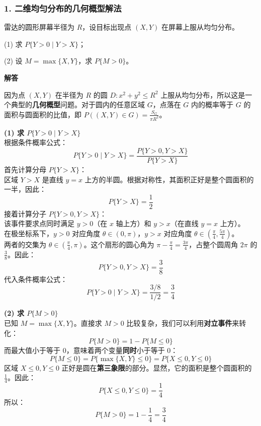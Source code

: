 
\vspace{1.5em}
\subsubsection*{1. 二维均匀分布的几何概型解法}

\begin{例题}[雷达屏幕上的均匀分布]
	雷达的圆形屏幕半径为 $R$，设目标出现点 $(X,Y)$ 在屏幕上服从均匀分布。
	
	(1) 求 $P\{Y>0 \mid Y>X\}$；
	
	(2) 设 $M = \max\{X,Y\}$，求 $P\{M>0\}$。
\end{例题}

\textbf{解答}\quad

因为点 $(X,Y)$ 在半径为 $R$ 的圆 $D: x^2 + y^2 \le R^2$ 上服从均匀分布，所以这是一个典型的\textbf{几何概型}问题。对于圆内的任意区域 $G$，点落在 $G$ 内的概率等于 $G$ 的面积与圆面积的比值，即 $P((X,Y) \in G) = \frac{S_G}{\pi R^2}$。

\textbf{(1) 求 $P\{Y>0 \mid Y>X\}$} \\
根据条件概率公式：
$$ P\{Y>0 \mid Y>X\} = \frac{P\{Y>0, Y>X\}}{P\{Y>X\}} $$
首先计算分母 $P\{Y>X\}$：\\
区域 $Y>X$ 是直线 $y=x$ 上方的半圆。根据对称性，其面积正好是整个圆面积的一半，因此：
$$ P\{Y>X\} = \frac{1}{2} $$
接着计算分子 $P\{Y>0, Y>X\}$：\\
该事件要求点同时满足 $y>0$（在 $x$ 轴上方）和 $y>x$（在直线 $y=x$ 上方）。\\
在极坐标系下，$y>0$ 对应角度 $\theta \in (0, \pi)$，$y>x$ 对应角度 $\theta \in (\frac{\pi}{4}, \frac{5\pi}{4})$。\\
两者的交集为 $\theta \in (\frac{\pi}{4}, \pi)$。这个扇形的圆心角为 $\pi - \frac{\pi}{4} = \frac{3\pi}{4}$，占整个圆周角 $2\pi$ 的 $\frac{3}{8}$。因此：
$$ P\{Y>0, Y>X\} = \frac{3}{8} $$
代入条件概率公式：
$$ P\{Y>0 \mid Y>X\} = \frac{3/8}{1/2} = \frac{3}{4} $$

\vspace{0.5em}
\textbf{(2) 求 $P\{M>0\}$} \\
已知 $M = \max\{X,Y\}$。直接求 $M>0$ 比较复杂，我们可以利用\textbf{对立事件}来转化：
$$ P\{M>0\} = 1 - P\{M \le 0\} $$
而最大值小于等于 0，意味着两个变量\textbf{同时}小于等于 0：
$$ P\{M \le 0\} = P\{\max\{X,Y\} \le 0\} = P\{X \le 0, Y \le 0\} $$
区域 $X \le 0, Y \le 0$ 正好是圆在\textbf{第三象限}的部分。显然，它的面积是整个圆面积的 $\frac{1}{4}$。因此：
$$ P\{X \le 0, Y \le 0\} = \frac{1}{4} $$
所以：
$$ P\{M>0\} = 1 - \frac{1}{4} = \frac{3}{4} $$
